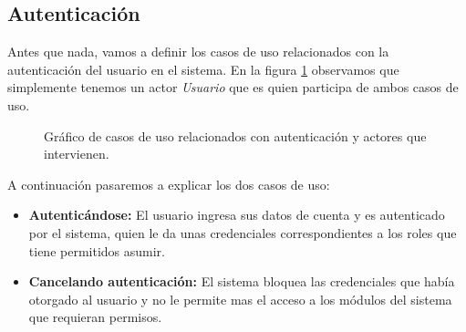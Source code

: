 \subsection{Autenticación}
\label{sec:casosuso_autenticacion}

\par Antes que nada, vamos a definir los casos de uso relacionados con la autenticación del usuario en el sistema. En la figura \ref{fig:casosuso_autenticacion} observamos que simplemente tenemos un actor \textit{Usuario} que es quien participa de ambos casos de uso.

\begin{figure}[ht]
  \center
  \caption{Gráfico de casos de uso relacionados con autenticación y actores que intervienen.}
  \label{fig:casosuso_autenticacion}
\end{figure}

\par A continuación pasaremos a explicar los dos casos de uso:
\begin{itemize}
  \item \textbf{Autenticándose:} El usuario ingresa sus datos de cuenta y es autenticado por el sistema, quien le da unas credenciales correspondientes a los roles que tiene permitidos asumir.
  \item \textbf{Cancelando autenticación:} El sistema bloquea las credenciales que había otorgado al usuario y no le permite mas el acceso a los módulos del sistema que requieran permisos.
\end{itemize}
